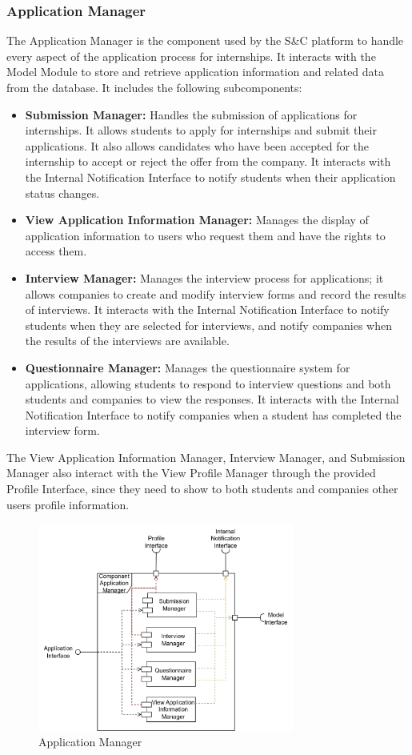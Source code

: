 \subsubsection{Application Manager}
The Application Manager is the component used by the S\&C platform to handle every aspect of the application process for internships. It interacts with the
Model Module to store and retrieve application information and related data from the database. It includes the following subcomponents:
\begin{itemize}
    \item \textbf{Submission Manager:} Handles the submission of applications for internships. It allows students to apply for internships and submit their
    applications. It also allows candidates who have been accepted for the internship to accept or reject the offer from the company. It interacts with the 
    Internal Notification Interface to notify students when their application status changes.
    \item \textbf{View Application Information Manager:} Manages the display of application information to users who request them and have the rights to access
    them.
    \item \textbf{Interview Manager:} Manages the interview process for applications; it allows companies to create and modify interview forms and record 
    the results of interviews. It interacts with the Internal Notification Interface to notify students when they are selected for interviews, and notify 
    companies when the results of the interviews are available. 
    \item \textbf{Questionnaire Manager:} Manages the questionnaire system for applications, allowing students to respond to interview questions and both 
    students and companies to view the responses. It interacts with the Internal Notification Interface to notify companies when a student has completed the 
    interview form.
\end{itemize}
The View Application Information Manager, Interview Manager, and Submission Manager also interact with the View Profile Manager through the provided Profile
Interface, since they need to show to both students and companies other users profile information.
\begin{figure}[H]
    \centering
    \includegraphics[width=0.75\textwidth]{Images/Components/application_Component.png}
    \caption{Application Manager}\label{fig:application_manager}
\end{figure}
